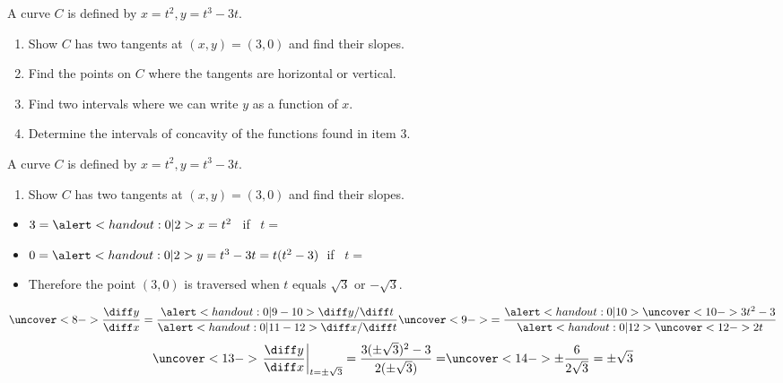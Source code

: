 \begin{frame}[t]
\begin{example}
A curve $C$ is defined by $x = t^2, y = t^3 - 3t$.
\begin{enumerate}
\item  Show $C$ has two tangents at $(x,y)=(3,0)$ and find their slopes.
\item  Find the points on $C$ where the tangents are horizontal or vertical.
\item  Find two intervals where we can write $y$ as a function of $x$.
\item  Determine the intervals of concavity of the functions found in item 3.
\end{enumerate}
\end{example}
\end{frame}




\begin{frame}[t]
\begin{example}
A curve $C$ is defined by \alert<handout:0| 2>{$x = t^2, y = t^3 - 3t$}.
\begin{enumerate}
\item  Show $C$ has two tangents at $(x,y)=(3,0)$ and find their slopes.
\end{enumerate}
\begin{itemize}
\item<2-| alert@3-4>  $3 = \alert<handout:0| 2>{x = t^2}$ \ if \ $t = $ 
\item<2-| alert@5-6>  $0 = \alert<handout:0| 2>{y = t^3 - 3t} = t(t^2-3)$\  if \ $t = $ 
\item<7->  Therefore the point $(3,0)$ is traversed when $t$ equals $\sqrt{3}$ or $-\sqrt{3}$.
\end{itemize}
\abovedisplayskip=0pt
\belowdisplayskip=0pt
\[
\uncover<8->{%
\frac{\diff y}{\diff x} = \frac{\alert<handout:0| 9-10>{\diff y / \diff t}}{\alert<handout:0| 11-12>{\diff x / \diff t}} %
}%
\uncover<9->{%
 = \frac{\alert<handout:0| 10>{\uncover<10->{3t^2-3 }}}{\alert<handout:0| 12>{\uncover<12->{2t }}}%
}%
\]
%
\abovedisplayskip=0pt
\belowdisplayskip=0pt
\[
\uncover<13->{%
\left. \frac{\diff y}{\diff x} \right|_{t = \pm \sqrt{3}} = \frac{3(\pm \sqrt{3})^2 - 3}{2(\pm \sqrt{3})} = %
}%
\uncover<14->{%
\pm \frac{6}{2\sqrt{3}} = \pm \sqrt{3}%
}%
\]
%
\end{example}
\end{frame}



